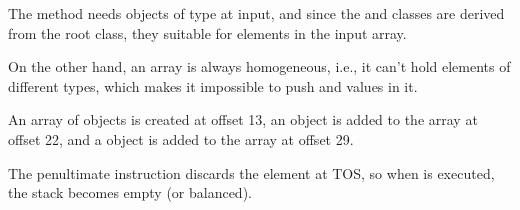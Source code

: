 The  method needs objects of type  at input, and since the  and 
 classes are derived from the root  class, they suitable for elements 
in the input array.

On the other hand, an array is always homogeneous, i.e., it can't hold elements of 
different types, which makes it impossible to push  and  values in it.


An array of  objects is created at offset 13, 
an  object is added to the array at offset 22, 
and a  object is added to the array at offset 29.


The penultimate  instruction discards the element at \ac{TOS}, 
so when  is executed, the stack becomes empty (or balanced).

